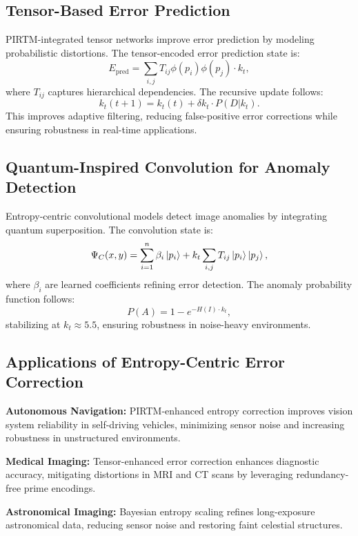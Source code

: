 \documentclass{article}
\theoremstyle{plain}
\begin{document}
\subsection{Tensor-Based Error Prediction}
PIRTM-integrated tensor networks improve error prediction by modeling probabilistic distortions. The tensor-encoded error prediction state is:
\begin{equation}
E_\text{pred} = \sum_{i,j} T_{ij} \phi(p_i) \phi(p_j) \cdot k_t,
\end{equation}
where \( T_{ij} \) captures hierarchical dependencies. The recursive update follows:
\begin{equation}
k_t(t+1) = k_t(t) + \delta k_t \cdot P(D | k_t).
\end{equation}
This improves adaptive filtering, reducing false-positive error corrections while ensuring robustness in real-time applications.

\subsection{Quantum-Inspired Convolution for Anomaly Detection}
Entropy-centric convolutional models detect image anomalies by integrating quantum superposition. The convolution state is:
\begin{equation}
\Psi_C(x, y) = \sum_{i=1}^{n} \beta_i \ket{p_i} + k_t \sum_{i,j} T_{ij} \ket{p_i} \ket{p_j},
\end{equation}
where \( \beta_i \) are learned coefficients refining error detection. The anomaly probability function follows:
\begin{equation}
P(A) = 1 - e^{-H(I) \cdot k_t},
\end{equation}
stabilizing at \( k_t \approx 5.5 \), ensuring robustness in noise-heavy environments.

\subsection{Applications of Entropy-Centric Error Correction}
\textbf{Autonomous Navigation:} PIRTM-enhanced entropy correction improves vision system reliability in self-driving vehicles, minimizing sensor noise and increasing robustness in unstructured environments.

\textbf{Medical Imaging:} Tensor-enhanced error correction enhances diagnostic accuracy, mitigating distortions in MRI and CT scans by leveraging redundancy-free prime encodings.

\textbf{Astronomical Imaging:} Bayesian entropy scaling refines long-exposure astronomical data, reducing sensor noise and restoring faint celestial structures.
\end{document}
